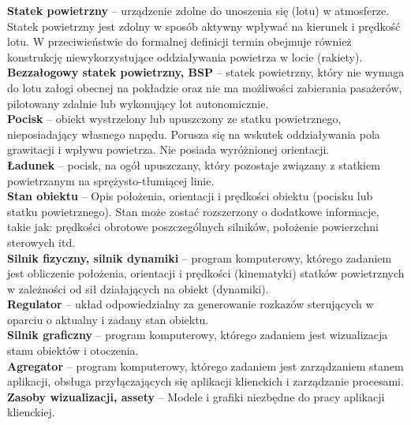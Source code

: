 \documentclass[15pt]{sprawozdanie}
\begin{document}
\textbf{Statek powietrzny} -- urządzenie zdolne do unoszenia się (lotu) w atmosferze. Statek powietrzny jest zdolny w sposób aktywny wpływać na kierunek i prędkość lotu. W przeciwieństwie do formalnej definicji termin obejmuje również konstrukcję niewykorzystujące oddziaływania powietrza w locie (rakiety).\\

\textbf{Bezzałogowy statek powietrzny, BSP} -- statek powietrzny, który nie wymaga do lotu załogi obecnej na pokładzie oraz nie ma możliwości zabierania pasażerów, pilotowany zdalnie lub wykonujący lot autonomicznie.\\ 

\textbf{Pocisk} -- obiekt wystrzelony lub upuszczony ze statku powietrznego, nieposiadający własnego napędu. Porusza się na wskutek oddziaływania pola grawitacji i wpływu powietrza. Nie posiada wyróżnionej orientacji.\\

\textbf{Ładunek} -- pocisk, na ogół upuszczany, który pozostaje związany z statkiem powietrzanym na sprężysto-tłumiącej linie. \\

\textbf{Stan obiektu} -- Opis położenia, orientacji i prędkości obiektu (pocisku lub statku powietrznego). Stan może zostać rozszerzony o dodatkowe informacje, takie jak: prędkości obrotowe poszczególnych silników, położenie powierzchni sterowych itd. \\

\textbf{Silnik fizyczny, silnik dynamiki} -- program komputerowy, którego zadaniem jest obliczenie położenia, orientacji i prędkości (kinematyki) statków powietrznych w zależności od sił działających na obiekt (dynamiki). \\

\textbf{Regulator} -- układ odpowiedzialny za generowanie rozkazów sterujących w oparciu o aktualny i zadany stan obiektu.\\

\textbf{Silnik graficzny} -- program komputerowy, którego zadaniem jest wizualizacja stanu obiektów i otoczenia.\\

\textbf{Agregator} --  program komputerowy, którego zadaniem jest zarządzaniem stanem aplikacji, obsługa przyłączających się aplikacji klienckich i zarządzanie procesami.\\

\textbf{Zasoby wizualizacji, assety} -- Modele i grafiki niezbędne do pracy aplikacji klienckiej.\\
\end{document}
